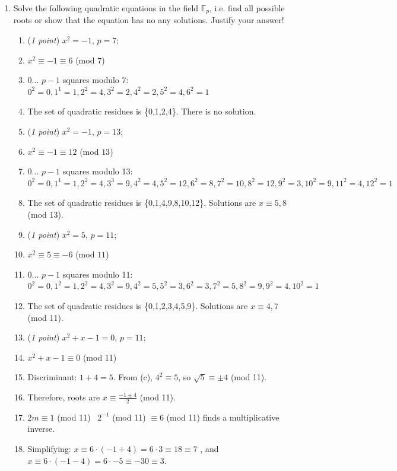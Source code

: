 \documentclass[11pt]{article}
\newcommand{\bbF}{\mathbb{F}}
\theoremstyle{definition}
\numberwithin{equation}{subsection}
\begin{document}
\begin{enumerate}
\begin{enumerate}
\item (\emph{2 points}) Prove that $(\bbF_p,+,\cdot)$ is a field. You can use the previous problem.
\item (\emph{4 points}) Construct a field with exactly $4$ elements.
\end{enumerate}
\fi

\item Solve the following quadratic equations in the field $\mathbb{F}_p$, i.e. find all possible roots or show that the equation has no any solutions. Justify your answer!

\begin{enumerate}
\item (\emph{1 point}) $x^2= -1$, $p=7$;
\item[] $x^2\equiv-1\equiv6$ (mod $7$)
\item[] 0... $p-1$ squares modulo 7: $0^2=0, 1^1=1, 2^2=4, 3^2=2, 4^2=2, 5^2=4, 6^2=1$
\item[] The set of quadratic residues is \{0,1,2,4\}. There is no solution.
\item (\emph{1 point}) $x^2=-1$, $p=13$;
\item[] $x^2\equiv-1\equiv12$ (mod $13$)
\item[] 0... $p-1$ squares modulo 13: $0^2=0, 1^1=1, 2^2= 4, 3^3= 9, 4^2=4, 5^2=12, 6^2=8, 7^2=10, 8^2=12, 9^2=3, 10^2=9, 11^2=4, 12^2=1$
\item[] The set of quadratic residues is \{0,1,4,9,8,10,12\}. Solutions are $x\equiv5,8$ (mod 13).
\item (\emph{1 point}) $x^2=5$, $p=11$;
\item[] $x^2\equiv5\equiv-6$ (mod $11$)
\item[] 0... $p-1$ squares modulo 11: $0^2=0,1^2=1,2^2=4,3^2=9,4^2=5,5^2=3,6^2=3,7^2=5,8^2=9,9^2=4,10^2=1$
\item[] The set of quadratic residues is \{0,1,2,3,4,5,9\}. Solutions are $x\equiv4,7$ (mod 11).
\item (\emph{1 point}) $x^2+x-1=0$, $p=11$;
\item[] $x^2+x-1\equiv0$ (mod 11)
\item[] Discriminant: $1+4=5$. From (c), $4^2\equiv5$, so $\sqrt{5}\equiv\pm 4$ (mod 11). 
\item[] Therefore, roots are $x\equiv\frac{-1\pm4}{2}$ (mod 11).
\item[] $2m\equiv1$ (mod 11) \Rightarrow\ $2^{-1}$ (mod 11) $\equiv6$ (mod 11) finds a multiplicative inverse.
\item[] Simplifying: $x\equiv6\cdot(-1+4)=6\cdot3\equiv18\equiv7$ , and $x\equiv6\cdot(-1-4)=6\cdot-5\equiv-30\equiv3$.

\end{enumerate}
\end{enumerate}
\end{document}

